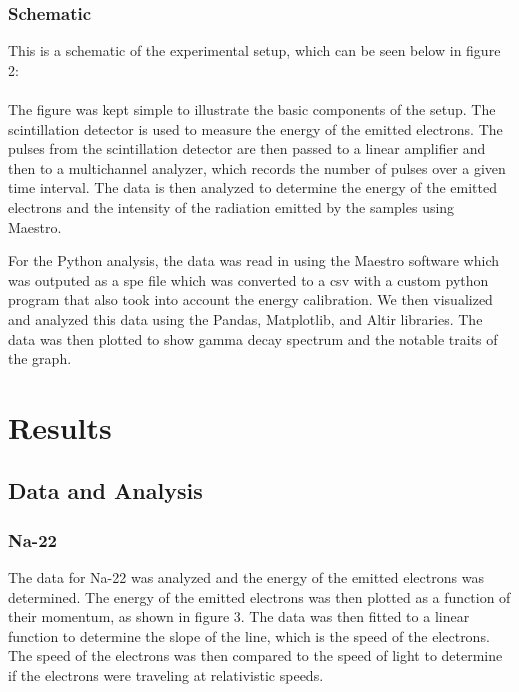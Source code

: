 \documentclass[12pt]{article}
\begin{document}
                        
                \subsubsection{Schematic}
                        This is a schematic of the experimental setup, which can be seen below in figure 2: \\ \\
                        
                        
                        The figure was kept simple to illustrate the basic components of the setup. 
                        The scintillation detector is used to measure the energy of the emitted electrons. 
                        The pulses from the scintillation detector are then passed to a linear amplifier and then 
                        to a multichannel analyzer, which records the number of pulses over a given time interval. 
                        The data is then analyzed to determine the energy of the emitted electrons and the intensity 
                        of the radiation emitted by the samples using Maestro.


                        For the Python analysis, the data was read in using the Maestro software which was outputed as a 
                        spe file which was converted to a csv with a custom python program that also took into account 
                        the energy calibration. We then visualized and analyzed this data using the Pandas, Matplotlib, and Altir libraries. 
                        The data was then plotted to show gamma decay spectrum and the notable traits of the graph.



\section{Results}
        \subsection{Data and Analysis}

                \subsubsection{Na-22}
                The data for Na-22 was analyzed and the energy of the emitted electrons was determined. 
                The energy of the emitted electrons was then plotted as a function of their momentum, 
                as shown in figure 3. The data was then fitted to a linear function to determine the slope 
                of the line, which is the speed of the electrons. The speed of the electrons was then compared 
                to the speed of light to determine if the electrons were traveling at relativistic speeds.
\end{document}
